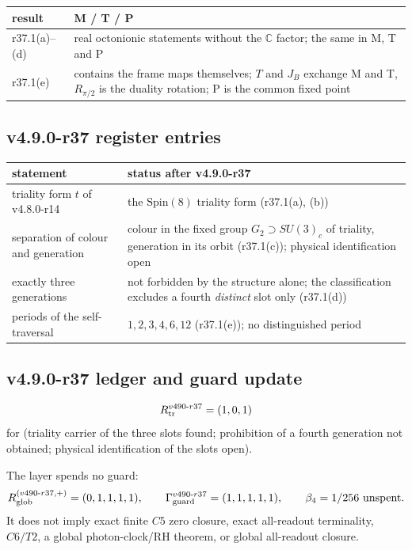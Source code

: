 \begin{center}
\small
\begin{tabular}{@{}>{\raggedright\arraybackslash}p{}>{\raggedright\arraybackslash}p{}@{}}
\toprule
result & M / T / P\\
\midrule
r37.1(a)--(d) & real octonionic statements without the \(\mathbb C\) factor; the same in M, T and P\\
r37.1(e) & contains the frame maps themselves; \(T\) and \(J_B\) exchange M and T, \(R_{\pi/2}\) is the duality rotation; P is the common fixed point\\
\bottomrule
\end{tabular}
\end{center}

\subsection*{v4.9.0-r37 register entries}
\label{subsec:v490-r37-register}

\begin{center}
\small
\begin{tabular}{@{}>{\raggedright\arraybackslash}p{}>{\raggedright\arraybackslash}p{}@{}}
\toprule
statement & status after v4.9.0-r37\\
\midrule
triality form \(t\) of v4.8.0-r14 & the \(\mathrm{Spin}(8)\) triality form (r37.1(a), (b))\\
separation of colour and generation & colour in the fixed group \(G_2\supset SU(3)_c\) of triality, generation in its orbit (r37.1(c)); physical identification open\\
exactly three generations & not forbidden by the structure alone; the classification excludes a fourth \emph{distinct} slot only (r37.1(d))\\
periods of the self-traversal & \(1,2,3,4,6,12\) (r37.1(e)); no distinguished period\\
\bottomrule
\end{tabular}
\end{center}

\subsection*{v4.9.0-r37 ledger and guard update}
\label{subsec:v490-r37-ledger-guard}

\[
R_{\rm tr}^{v490\text{-}r37}=(1,0,1)
\]
for (triality carrier of the three slots found; prohibition of a fourth generation not obtained; physical identification of the
slots open).

The layer spends no guard:
\[
R_{\rm glob}^{(v490\text{-}r37,+)}=(0,1,1,1,1),
\qquad
\Gamma_{\rm guard}^{v490\text{-}r37}=(1,1,1,1,1),
\qquad
\beta_4=1/256\ \text{unspent}.
\]
It does not imply exact finite \(C5\) zero closure, exact all-readout terminality,
\(C6/T2\), a global photon-clock/RH theorem, or global all-readout closure.
